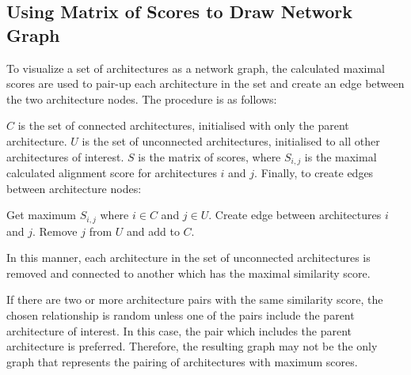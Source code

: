
\subsection{Using Matrix of Scores to Draw Network Graph}

To visualize a set of architectures as a network graph, the calculated maximal scores are used to pair-up each architecture in the set and create an edge between the two architecture nodes. The procedure is as follows:

$C$ is the set of connected architectures, initialised with only the parent architecture. $U$ is the set of unconnected architectures, initialised to all other architectures of interest. $S$ is the matrix of scores, where $S_{i,j}$ is the maximal calculated alignment score for architectures $i$ and $j$. Finally, to create edges between architecture nodes:
\begin{algorithmic}
\STATE Get maximum $S_{i,j}$ where $i \in C$ and $j \in U$.
\STATE Create edge between architectures $i$ and $j$.
\STATE Remove $j$ from $U$ and add to $C$.
\ENDWHILE
\end{algorithmic}
In this manner, each architecture in the set of unconnected architectures is removed and connected to another which has the maximal similarity score.

If there are two or more architecture pairs with the same similarity score, the chosen relationship is random unless one of the pairs include the parent architecture of interest. In this case, the pair which includes the parent architecture is preferred. Therefore, the resulting graph may not be the only graph that represents the pairing of architectures with maximum scores. 






